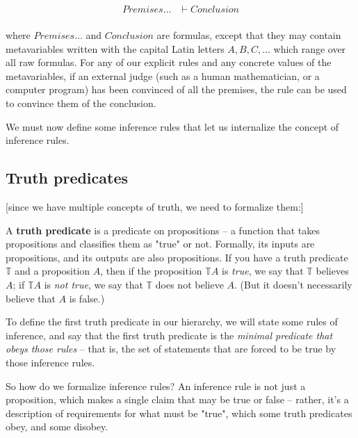 \documentclass{article}
\begin{document}
  \newcommand{\presep}{,\,}
  \newcommand{\globalrule}[2]{#1 &\vdash #2}
  
  \begin{align*}
    \globalrule{Premises\dots}{Conclusion}\\
  \end{align*}
  
  where $Premises\dots$ and $Conclusion$ are formulas, except that they may contain metavariables written with the capital Latin letters $A, B, C, \dots$ which range over all raw formulas. For any of our explicit rules and any concrete values of the metavariables, if an external judge (such as a human mathematician, or a computer program) has been convinced of all the premises, the rule can be used to convince them of the conclusion.
  
  We must now define some inference rules that let us internalize the concept of inference rules.


  \iffalse

  \subsection{Truth predicates}
  
  [since we have multiple concepts of truth, we need to formalize them:]
  
  A \textbf{truth predicate} is a predicate on propositions – a function that takes propositions and classifies them as "true" or not. Formally, its inputs are propositions, and its outputs are also propositions. If you have a truth predicate $\mathbb{T}$ and a proposition $A$, then if the proposition $\mathbb{T} A$ is \emph{true}, we say that $\mathbb{T}$ believes $A$; if $\mathbb{T} A$ is \emph{not true}, we say that $\mathbb{T}$ does not believe $A$. (But it doesn't necessarily believe that $A$ is false.)
  
  To define the first truth predicate in our hierarchy, we will state some rules of inference, and say that the first truth predicate is the \emph{minimal predicate that obeys those rules} – that is, the set of statements that are forced to be true by those inference rules.
  
  So how do we formalize inference rules? An inference rule is not just a proposition, which makes a single claim that may be true or false – rather, it's a description of requirements for what must be "true", which some truth predicates obey, and some disobey.
    
\end{document}
